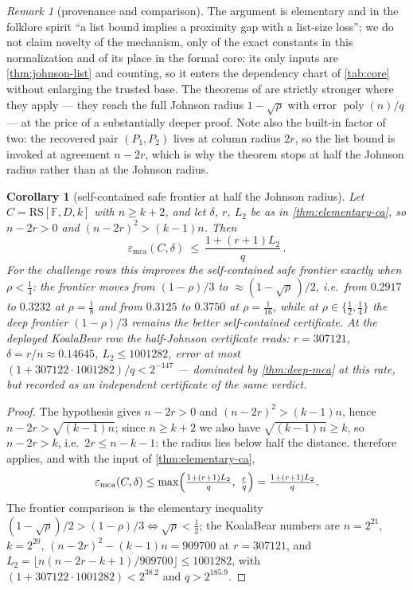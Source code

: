 \documentclass[11pt]{article}
\newtheorem{corollary}[corollary]{Corollary}
\theoremstyle{definition}
\theoremstyle{remark}
\newtheorem{remark}[remark]{Remark}
\newcommand{\F}{\mathbb{F}}
\newcommand{\RS}{\mathrm{RS}}
\newcommand{\emca}{\varepsilon_{\mathrm{mca}}}
\begin{document}
\begin{remark}[provenance and comparison]\label{rem:ca-provenance}
The argument is elementary and in the folklore spirit ``a list bound implies a proximity gap with a list-size loss''; we do not claim novelty of the mechanism, only of the exact constants in this normalization and of its place in the formal core: its only inputs are \cref{thm:johnson-list} and counting, so it enters the dependency chart of \cref{tab:core} without enlarging the trusted base. The theorems of \cite{BCIKS20,BCHKS25} are strictly stronger where they apply --- they reach the full Johnson radius $1-\sqrt\rho$ with error $\operatorname{poly}(n)/q$ --- at the price of a substantially deeper proof. Note also the built-in factor of two: the recovered pair $(P_1,P_2)$ lives at column radius $2r$, so the list bound is invoked at agreement $n-2r$, which is why the theorem stops at half the Johnson radius rather than at the Johnson radius.
\end{remark}

\begin{corollary}[self-contained safe frontier at half the Johnson radius]\label{cor:self-contained-safe}
Let $C=\RS[\F,D,k]$ with $n\ge k+2$, and let $\delta$, $r$, $L_2$ be as in \cref{thm:elementary-ca}, so $n-2r>0$ and $(n-2r)^2>(k-1)n$. Then
\[
\emca(C,\delta)\ \le\ \frac{1+(r+1)L_2}{q}\,.
\]
For the challenge rows this improves the self-contained safe frontier exactly when $\rho<\tfrac14$: the frontier moves from $(1-\rho)/3$ to $\approx(1-\sqrt\rho\,)/2$, i.e.\ from $0.2917$ to $0.3232$ at $\rho=\tfrac18$ and from $0.3125$ to $0.3750$ at $\rho=\tfrac1{16}$, while at $\rho\in\{\tfrac12,\tfrac14\}$ the deep frontier $(1-\rho)/3$ remains the better self-contained certificate. At the deployed KoalaBear row the half-Johnson certificate reads: $r=307121$, $\delta=r/n\approx0.14645$, $L_2\le1001282$, error at most $(1+307122\cdot1001282)/q<2^{-147}$ --- dominated by \cref{thm:deep-mca} at this rate, but recorded as an independent certificate of the same verdict.
\end{corollary}

\begin{proof}
The hypothesis gives $n-2r>0$ and $(n-2r)^2>(k-1)n$, hence $n-2r>\sqrt{(k-1)n}$; since $n\ge k+2$ we also have $\sqrt{(k-1)n}\ge k$, so $n-2r>k$, i.e.\ $2r\le n-k-1$: the radius lies below half the distance.  therefore applies, and with the input of \cref{thm:elementary-ca},
\[
\emca(C,\delta)\le\max\Bigl(\tfrac{1+(r+1)L_2}{q},\ \tfrac rq\Bigr)=\tfrac{1+(r+1)L_2}{q}.
\]
The frontier comparison is the elementary inequality $(1-\sqrt\rho)/2>(1-\rho)/3\iff\sqrt\rho<\tfrac12$; the KoalaBear numbers are $n=2^{21}$, $k=2^{20}$, $(n-2r)^2-(k-1)n=909700$ at $r=307121$, and $L_2=\lfloor n(n-2r-k+1)/909700\rfloor\le1001282$, with $(1+307122\cdot1001282)<2^{38.2}$ and $q>2^{185.9}$.
\end{proof}
\end{document}
